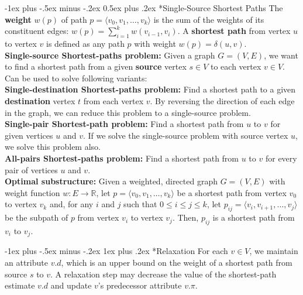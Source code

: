 \documentclass[10pt,landscape]{article}
\makeatletter
\renewcommand{\section}{\@startsection{section}{1}{0mm}%
                                {-1ex plus -.5ex minus -.2ex}%
                                {0.5ex plus .2ex}%
                                {\normalfont\large\bfseries}}
\renewcommand{\subsubsection}{\@startsection{subsubsection}{3}{0mm}%
                                {-1ex plus -.5ex minus -.2ex}%
                                {1ex plus .2ex}%
                                {\normalfont\small\bfseries}}
\makeatother
\begin{document}
\begin{multicols}{3}
\section*{Single-Source Shortest Paths}
\scriptsize {
The \textbf{weight} $w(p)$ of path $p = \langle v_0, v_1,\ldots,v_k\rangle$ is the sum of the weights of its constituent edges: $w(p) = \sum_{i=1}^{k}w(v_{i-1}, v_{i})$. A \textbf{shortest path} from vertex $u$ to vertex $v$ is defined as any path $p$ with weight $w(p) = \delta(u,v)$.\\
\textbf{Single-source Shortest-paths problem:} Given a graph $G = (V,E)$, we want to find a shortest path from a given \textbf{source} vertex $s \in V$ to each vertex $v \in V$. Can be used to solve following variants:\\
\textbf{Single-destination Shortest-paths problem:} Find a shortest path to a given \textbf{destination} vertex $t$ from each vertex $v$. By reversing the direction of each edge in the graph, we can reduce this problem to a single-source problem.\\
\textbf{Single-pair Shortest-path problem:} Find a shortest path from $u$ to $v$ for given vertices $u$ and $v$. If we solve the single-source problem with source vertex $u$, we solve this problem also. \\
\textbf{All-pairs Shortest-paths problem:} Find a shortest path from $u$ to $v$ for every pair of vertices $u$ and $v$.\\
\textbf{Optimal substructure:} Given a weighted, directed graph $G = (V,E)$ with weight function $w: E \rightarrow \mathbb{R}$, let $p = \langle v_0, v_1,\ldots, v_k\rangle$ be a shortest path from vertex $v_0$ to vertex $v_k$ and, for any $i$ and $j$ such that $0 \leq i \leq j \leq k$, let $p_{ij} = \langle v_i, v_{i+1},\ldots,v_j\rangle$ be the subpath of $p$ from vertex $v_i$ to vertex $v_j$. Then, $p_{ij}$ is a shortest path from $v_i$ to $v_j$.
}

\subsubsection*{Relaxation}
\scriptsize {
For each $v \in V$, we maintain an attribute $v.d$, which is an upper bound on the weight of a shortest path from source $s$ to $v$. A relaxation step may decrease the value of the shortest-path estimate $v.d$ and update $v$'s predecessor attribute $v.\pi$. 
}


\end{multicols}
\end{document}
